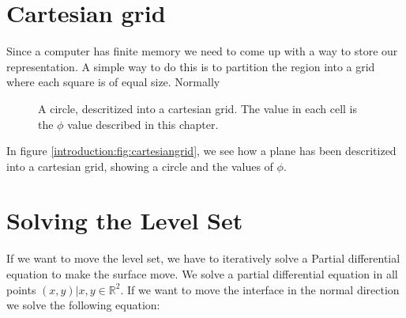 \section*{Cartesian grid}

Since a computer has finite memory we need to come up with a way to
store our representation. A simple way to do this is to partition the region into a grid where each
square is of equal size. Normally

\begin{figure}[htb] \centering
  \caption{A circle, descritized into a cartesian grid. The value in
    each cell is the $\phi$ value described in this chapter.}
  \label{introduction:fig:cartesiangrid}
\end{figure}

In figure \vref{introduction:fig:cartesiangrid}, we see how a plane
has been descritized into a cartesian grid, showing a circle and the
values of $\phi$.


\section*{Solving the Level Set}\label{sec:intro:solve} 


If we want to move the level set, we have to iteratively solve a
Partial differential equation to make the surface move. We solve a
partial differential equation in all points $(x,y) | x,y \in
\mathbb{R}^{2}$. If we want to move the interface in the normal
direction we solve the following equation:


